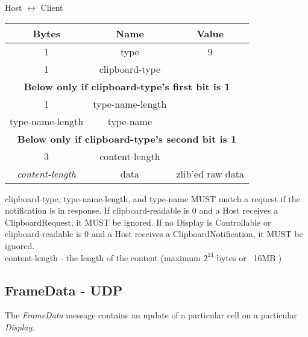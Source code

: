 \begin{center}
    Host $\leftrightarrow$ Client\\
    \begin{tabular}{|c|c|c|}
        \hline
        \textbf{Bytes}        & \textbf{Name}    & \textbf{Value}   \\
        \hline
        1                     & type             & 9                \\
        \hline
        1                     & clipboard-type   &                  \\
        \hline
        \multicolumn{3}{|c|}{\textbf{Below only if clipboard-type's first bit is 1} } \\
        \hline
        1                     & type-name-length &                  \\
        \hline
        type-name-length      & type-name        &                  \\
        \hline
        \multicolumn{3}{|c|}{\textbf{Below only if clipboard-type's second bit is 1} } \\
        3                     & content-length   &                  \\
        \hline
        \emph{content-length} & data             & zlib'ed raw data \\
        \hline
    \end{tabular}
\end{center}


clipboard-type, type-name-length, and type-name MUST match a request if the notification is in response. If
clipboard-readable is 0 and a Host receives a ClipboardRequest, it MUST be ignored. If no Display is Controllable or
clipboard-readable is 0 and a Host receives a ClipboardNotification, it MUST be ignored.\\

content-length -  the length of the content  (maximum $2^{24}$ bytes or ~16MB )\\

\subsection{FrameData - UDP}
The \emph{FrameData} message contains an update of a particular cell on a particular \emph{Display}.


